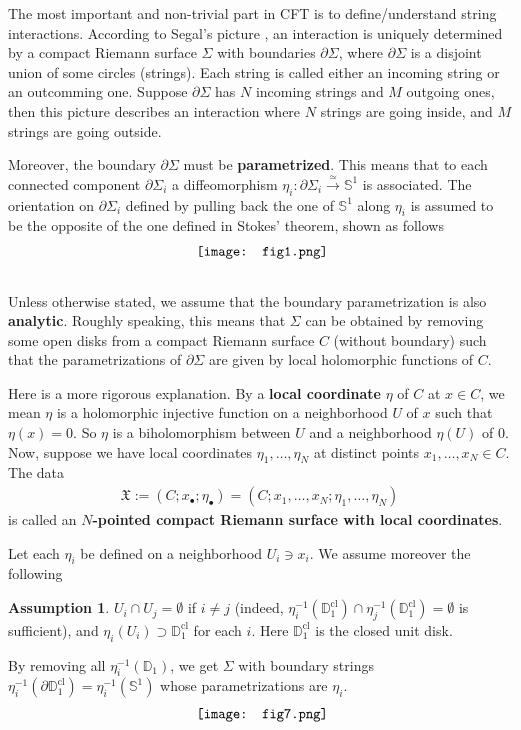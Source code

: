 \documentclass[12pt,a4paper,notitlepage]{article}
\theoremstyle{definition}
\newtheorem{ass}[df]{Assumption}
\theoremstyle{plain}
\newcommand{\fk}{\mathfrak}
\newcommand{\blt}{\bullet}
\newcommand{\Dbb}{\mathbb D}
\newcommand{\Sbb}{{\mathbb S}}
\newcommand{\cl}{\mathrm{cl}}
\numberwithin{equation}{section}
\begin{document}
The most important and non-trivial part in CFT is to define/understand string interactions. According to Segal's picture \cite{Seg88}, an interaction is uniquely determined by a compact Riemann surface $\Sigma$ with boundaries $\partial\Sigma$, where $\partial\Sigma$ is a disjoint union of some circles (strings). Each string is called either an incoming string or an outcomming one. Suppose $\partial\Sigma$ has $N$ incoming strings and $M$ outgoing ones, then this picture describes an interaction where $N$ strings are going inside, and $M$ strings are going outside. 

Moreover, the boundary $\partial\Sigma$ must be \textbf{parametrized}. This means that to each connected component $\partial\Sigma_i$ a diffeomorphism $\eta_i:\partial\Sigma_i\xrightarrow{\simeq}\Sbb^1$ is associated. The orientation on $\partial\Sigma_i$ defined by pulling back the one of $\Sbb^1$ along $\eta_i$ is assumed to be the opposite of the one defined in Stokes' theorem, shown as follows
\begin{align}
	\vcenter{\hbox{{
				\texttt{[image: fig1.png]}}}}\label{fig1}
\end{align}


\subsection{}\label{lb17}

Unless otherwise stated, we assume that the boundary parametrization is also \textbf{analytic}. Roughly speaking, this means that $\Sigma$ can be obtained by removing some open  disks from a compact Riemann surface $C$ (without boundary) such that the parametrizations of $\partial\Sigma$ are given by local holomorphic functions of $C$. 

Here is a more rigorous explanation. By a \textbf{local coordinate} $\eta$ of $C$ at $x\in C$, we mean $\eta$ is a holomorphic injective function  on a neighborhood $U$ of $x$ such that $\eta(x)=0$. So $\eta$ is a biholomorphism between $U$ and a neighborhood $\eta(U)$ of $0$. Now, suppose we have local coordinates $\eta_1,\dots,\eta_N$ at distinct points $x_1,\dots,x_N\in C$. The data
\begin{align}
\fk X:=(C;x_\blt;\eta_\blt)=(C;x_1,\dots,x_N;\eta_1,\dots,\eta_N)	
\end{align}
is called an \textbf{$N$-pointed compact Riemann surface with local coordinates}. 

Let each $\eta_i$ be defined on a neighborhood $U_i\ni x_i$. We assume moreover the following
\begin{ass}\label{lb11}
$U_i\cap U_j=\emptyset$ if $i\neq j$ (indeed, $\eta_i^{-1}(\Dbb_1^\cl)\cap \eta_j^{-1}(\Dbb_1^\cl)=\emptyset$ is sufficient), and $\eta_i(U_i)\supset\Dbb_1^\cl$ for each $i$. Here $\Dbb_1^\cl$ is the closed unit  disk.
\end{ass} 
By removing all $\eta_i^{-1}(\Dbb_1)$, we get $\Sigma$ with boundary strings $\eta_i^{-1}(\partial\Dbb_1^\cl)=\eta_i^{-1}(\Sbb^1)$ whose parametrizations are $\eta_i$.
\begin{align*}
	\vcenter{\hbox{{
				\texttt{[image: fig7.png]}}}}
\end{align*}
\end{document}
